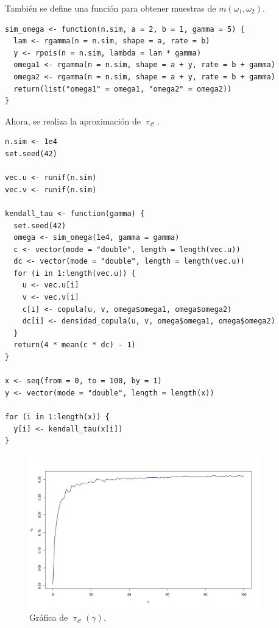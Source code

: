 \documentclass[11pt,a4paper]{article}
\newcommand{\C}{\mathcal{C}}
\begin{document}
También se define una función para obtener muestras de $m(\omega_1, \omega_2)$.\\

\begin{lstlisting}
sim_omega <- function(n.sim, a = 2, b = 1, gamma = 5) {
  lam <- rgamma(n = n.sim, shape = a, rate = b)
  y <- rpois(n = n.sim, lambda = lam * gamma)
  omega1 <- rgamma(n = n.sim, shape = a + y, rate = b + gamma)
  omega2 <- rgamma(n = n.sim, shape = a + y, rate = b + gamma)
  return(list("omega1" = omega1, "omega2" = omega2))
}
\end{lstlisting}

Ahora, se realiza la aproximación de $\uptau_\C$.\\

\begin{lstlisting}
n.sim <- 1e4
set.seed(42)

vec.u <- runif(n.sim)
vec.v <- runif(n.sim)

kendall_tau <- function(gamma) {
  set.seed(42)
  omega <- sim_omega(1e4, gamma = gamma)
  c <- vector(mode = "double", length = length(vec.u))
  dc <- vector(mode = "double", length = length(vec.u))
  for (i in 1:length(vec.u)) {
    u <- vec.u[i]
    v <- vec.v[i]
    c[i] <- copula(u, v, omega$omega1, omega$omega2)
    dc[i] <- densidad_copula(u, v, omega$omega1, omega$omega2)
  }
  return(4 * mean(c * dc) - 1)
}

x <- seq(from = 0, to = 100, by = 1)
y <- vector(mode = "double", length = length(x))

for (i in 1:length(x)) {
  y[i] <- kendall_tau(x[i])
}
\end{lstlisting}\leavevmode\newline

\begin{figure}[h]
\centering\includegraphics[width=10cm]{kendall_tau.png}
\caption{Gráfica de $\uptau_\C (\gamma)$.}
\label{fig:kendall_tau}
\end{figure}
\end{document}

